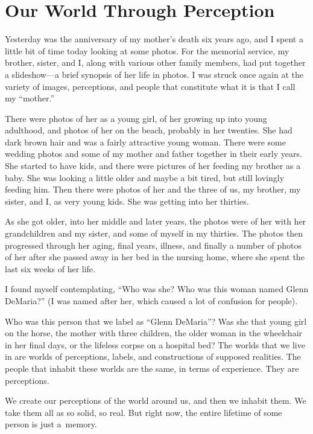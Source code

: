 
\chapter{Our World Through Perception}

Yesterday was the anniversary of my mother's death six years ago, and I spent a little bit of time today looking at some photos. For the memorial service, my brother, sister, and I, along with various other family members, had put together a slideshow---a brief synopsis of her life in photos. I was struck once again at the variety of images, perceptions, and people that constitute what it is that I call my ``mother.''

There were photos of her as a young girl, of her growing up into young adulthood, and photos of her on the beach, probably in her twenties. She had dark brown hair and was a fairly attractive young woman. There were some wedding photos and some of my mother and father together in their early years. She started to have kids, and there were pictures of her feeding my brother as a baby. She was looking a little older and maybe a bit tired, but still lovingly feeding him. Then there were photos of her and the three of us, my brother, my sister, and I, as very young kids. She was getting into her thirties.

As she got older, into her middle and later years, the photos were of her with her grandchildren and my sister, and some of myself in my thirties. The photos then progressed through her aging, final years, illness, and finally a number of photos of her after she passed away in her bed in the nursing home, where she spent the last six weeks of her life.

I found myself contemplating, ``Who was she? Who was this woman named Glenn DeMaria?'' (I was named after her, which caused a lot of confusion for people).

Who was this person that we label as ``Glenn DeMaria''? Was she that young girl on the horse, the mother with three children, the older woman in the wheelchair in her final days, or the lifeless corpse on a hospital bed? The worlds that we live in are worlds of perceptions, labels, and constructions of supposed realities. The people that inhabit these worlds are the same, in terms of experience. They are perceptions.

We create our perceptions of the world around us, and then we inhabit them. We take them all as so solid, so real. But right now, the entire lifetime of some person is just \mbox{a memory.}

